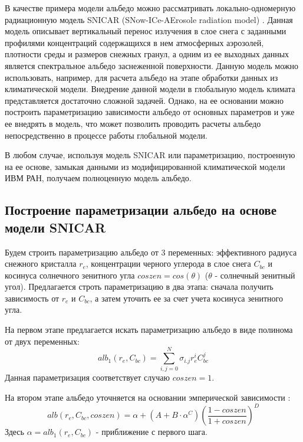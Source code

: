 \documentclass[a4paper, fontsize=14pt]{scrartcl}
\begin{document}
В качестве примера модели альбедо можно рассматривать локально-одномерную радиационную модель SNICAR (SNow-ICe-AErosole radiation model) \cite{Flanner2007}. Данная модель описывает вертикальный перенос излучения в слое снега с заданными профилями концентраций содержащихся в нем атмосферных аэрозолей, плотности среды и размеров снежных гранул, а одним из ее выходных данных является спектральное альбедо заснеженной поверхности. Данную модель можно использовать, например, для расчета альбедо на этапе обработки данных из климатической модели. Внедрение данной модели в глобальную модель климата представляется достаточно сложной задачей. Однако, на ее основании можно построить параметризацию зависимости альбедо от основных параметров и уже ее внедрять в модель, что может позволить проводить расчеты альбедо непосредственно в процессе работы глобальной модели. 

В любом случае, используя модель SNICAR или параметризацию, построенную на ее основе, замыкая данными из модифицированной климатической модели ИВМ РАН, получаем полноценную модель альбедо.

\subsection{Построение параметризации альбедо на основе модели SNICAR}

Будем строить параметризацию альбедо от 3 переменных: эффективного радиуса снежного кристалла $r_e$, концентрации черного углерода в слое снега $C_{bc}$ и косинуса солнечного зенитного угла $coszen = cos(\theta)$ ($\theta$ - солнечный зенитный угол). Предлагается строть параметризацию в два этапа: сначала получить зависимость от $r_e$ и $C_{bc}$, а затем уточить ее за счет учета косинуса зенитного угла.

На первом этапе предлагается искать параметризацию альбедо в виде полинома от двух переменных:
\begin{equation}
    alb_1(r_e, C_{bc}) = \sum_{i,j = 0}^N \sigma_{i.j} r_e^i C_{bc}^j   \label{sys}  
\end{equation}
Данная параметризация соответствует случаю $coszen = 1$.

На втором этапе альбедо уточняется на основании эмперической зависимости \cite{Saito2019}:
\begin{equation}
    alb(r_e, C_{bc}, coszen) = \alpha + (A + B \cdot \alpha^C) \left( \dfrac{1 - coszen}{1 + coszen} \right)^D     \label{sys}  
\end{equation}
Здесь $\alpha = alb_1(r_e, C_{bc})$ - приближение с первого шага.
\end{document}
